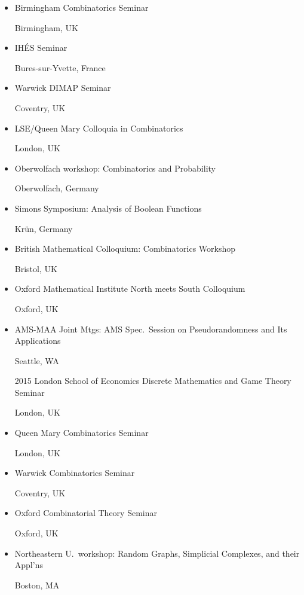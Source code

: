 \documentclass[11pt]{amsart}
\newcommand{\rightloc}[1]{\hfill {\raggedright #1}}
\begin{document}
\begin{itemize}[leftmargin=.4in,itemsep=5pt,topsep=0pt,label={}]
\item Birmingham Combinatorics Seminar \rightloc{Birmingham, UK}

\item IH\'ES Seminar \rightloc{Bures-sur-Yvette, France}

\item Warwick DIMAP Seminar \rightloc{Coventry, UK}


\item LSE/Queen Mary Colloquia in Combinatorics \rightloc{London, UK}

\item Oberwolfach workshop: Combinatorics and Probability \rightloc{Oberwolfach, Germany}

\item Simons Symposium: Analysis of Boolean Functions \rightloc{Kr\"un, Germany}

\item British Mathematical Colloquium: Combinatorics Workshop \rightloc{Bristol, UK}
  
\item Oxford Mathematical Institute North meets South Colloquium \rightloc{Oxford, UK}

\item AMS-MAA Joint Mtgs: AMS Spec.~Session on Pseudorandomness and Its Applications \rightloc{Seattle, WA}

\item[2015] 
  London School of Economics Discrete Mathematics and
  Game Theory Seminar \rightloc{London, UK}

\item 
  Queen Mary Combinatorics Seminar \rightloc{London, UK}

\item Warwick Combinatorics Seminar \rightloc{Coventry, UK}

\item Oxford Combinatorial Theory Seminar \rightloc{Oxford, UK}
\item Northeastern U.\ workshop: Random Graphs, Simplicial Complexes, and their Appl'ns \rightloc{Boston, MA}


\end{itemize}
\end{document}
